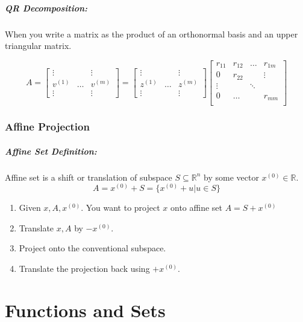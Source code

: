 \documentclass[a4paper,12pt]{report}
\def\reals{\mathbb{R}}
\begin{document}
\paragraph{QR Decomposition: } When you write a matrix as the product of an orthonormal basis and an upper triangular matrix.

\begin{equation}
A = \begin{bmatrix}
\vdots & & \vdots \\
v^{(1)} & \dots & v^{(m)} \\
\vdots & & \vdots
\end{bmatrix} = 
\begin{bmatrix}
\vdots & & \vdots \\
z^{(1)} & \dots & z^{(m)} \\
\vdots & & \vdots
\end{bmatrix}
\begin{bmatrix}
r_{11} & r_{12} & \dots & r_{1m} \\
0 & r_{22} & & \vdots \\
\vdots & & \ddots & \\
0 & \dots & & r_{mm} \\
\end{bmatrix}
\end{equation}

\subsection{Affine Projection}

\paragraph{Affine Set Definition: } Affine set is a shift or translation of subspace $S \subseteq \reals^n$ by some vector $x^{(0)} \in \reals$. $$A = x^{(0)} + S = \{x^{(0)} + u | u\in S\}$$

\begin{enumerate}
\item Given $x,A, x^{(0)}$. You want to project $x$ onto affine set $A = S + x^{(0)}$
\item Translate $x, A$ by $-x^{(0)}$.
\item Project onto the conventional subspace.
\item Translate the projection back using $+x^{(0)}$.
\end{enumerate}


\chapter{Functions and Sets}
\end{document}
